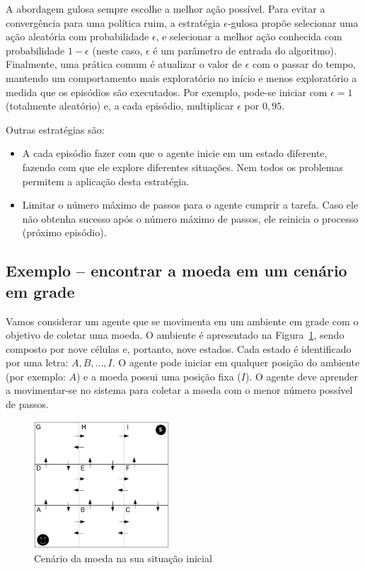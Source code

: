 A abordagem gulosa sempre escolhe a melhor ação possível. Para evitar a convergência para uma política ruim, a estratégia $\epsilon$-gulosa propõe selecionar uma ação aleatória com probabilidade $\epsilon$, e selecionar a melhor ação conhecida com probabilidade $1 - \epsilon$ (neste caso, $\epsilon$ é um parâmetro de entrada do algoritmo). Finalmente, uma prática comum é atualizar o valor de $\epsilon$ com o passar do tempo, mantendo um comportamento mais exploratório no início e menos exploratório a medida que os episódios são executados. Por exemplo, pode-se iniciar com $\epsilon = 1$ (totalmente aleatório) e, a cada episódio, multiplicar $\epsilon$ por $0,95$.

Outras estratégias são:
\begin{itemize}
	\item A cada episódio fazer com que o agente inicie em um estado diferente, fazendo com que ele explore diferentes situações. Nem todos os problemas permitem a aplicação desta estratégia.
	
	\item Limitar o número máximo de passos para o agente cumprir a tarefa. Caso ele não obtenha sucesso após o número máximo de passos, ele reinicia o processo (próximo episódio).
\end{itemize}

\subsection{Exemplo -- encontrar a moeda em um cenário em grade}

Vamos considerar um agente que se movimenta em um ambiente em grade com o objetivo de coletar uma moeda. O ambiente é apresentado na Figura~\ref{fig:exemplo-moeda-q-learning}, sendo composto por nove células e, portanto, nove estados. Cada estado é identificado por uma letra: $A, B, \hdots, I$. O agente pode iniciar em qualquer posição do ambiente (por exemplo: $A$) e a moeda possui uma posição fixa ($I$). O agente deve aprender a movimentar-se no sistema para coletar a moeda com o menor número possível de passos.

\begin{figure}[h]
	\centering
	\includegraphics[width=0.45\textwidth]{img/exemplo-moeda-q-learning-1}
	\caption{Cenário da moeda na sua situação inicial}
	\label{fig:exemplo-moeda-q-learning}
\end{figure}

